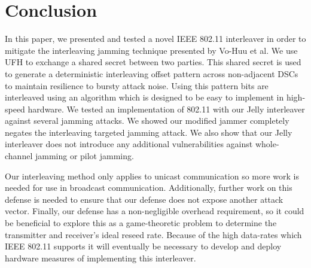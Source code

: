 \documentclass[sigconf, anonymous]{acmart}
\begin{document}
\section{Conclusion}
\label{sec:conclusion}

In this paper, we  presented and tested a novel IEEE 802.11 interleaver in order to mitigate the interleaving jamming technique presented by Vo-Huu et al. We use UFH to exchange a shared secret between two parties. This shared secret is used to generate a deterministic interleaving offset pattern across non-adjacent DSCs to maintain resilience to bursty attack noise. Using this pattern bits are interleaved using an algorithm which is designed to be easy to implement in high-speed hardware. We tested an implementation of 802.11 with our Jelly interleaver against several jamming attacks. We showed our modified jammer completely negates the interleaving targeted jamming attack. We also show that our Jelly interleaver does not introduce any additional vulnerabilities against whole-channel jamming or pilot jamming. 



Our interleaving method only applies to unicast communication so more work is needed for use in broadcast communication. Additionally, further work on this defense is needed to ensure that our defense does not expose another attack vector. Finally, our defense has a non-negligible overhead requirement, so it could be beneficial to explore this as a game-theoretic problem to determine the transmitter and receiver's ideal reseed rate. Because of the high data-rates which IEEE 802.11 supports it will eventually be necessary to develop and deploy hardware measures of implementing this interleaver.

\end{document}
